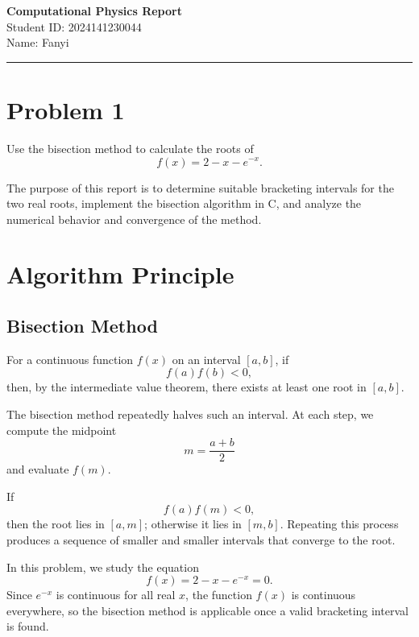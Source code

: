 \documentclass[12pt,a4paper]{article}
\newcommand{\HomeworkTitle}{Computational Physics Report}
\newcommand{\StudentID}{2024141230044}
\newcommand{\StudentName}{Fanyi}
\begin{document}
\begin{center}
    {\LARGE \textbf{\HomeworkTitle}}\\[1.2em]
    {\large Student ID: \StudentID}\\[0.5em]
    {\large Name: \StudentName}
\end{center}

\vspace{0.5em}
\noindent\rule{\textwidth}{0.8pt}
\vspace{0.5em}

\section*{Problem 1}

Use the bisection method to calculate the roots of
\[
f(x)=2-x-e^{-x}.
\]

The purpose of this report is to determine suitable bracketing intervals for the two real roots, implement the bisection algorithm in C, and analyze the numerical behavior and convergence of the method.

\newpage
\tableofcontents
\newpage

\section{Algorithm Principle}

\subsection*{Bisection Method}

For a continuous function $f(x)$ on an interval $[a,b]$, if
\[
f(a)f(b)<0,
\]
then, by the intermediate value theorem, there exists at least one root in $[a,b]$.

The bisection method repeatedly halves such an interval. At each step, we compute the midpoint
\[
m=\frac{a+b}{2}
\]
and evaluate $f(m)$.

If
\[
f(a)f(m)<0,
\]
then the root lies in $[a,m]$; otherwise it lies in $[m,b]$. Repeating this process produces a sequence of smaller and smaller intervals that converge to the root.

In this problem, we study the equation
\[
f(x)=2-x-e^{-x}=0.
\]
Since $e^{-x}$ is continuous for all real $x$, the function $f(x)$ is continuous everywhere, so the bisection method is applicable once a valid bracketing interval is found.
\end{document}
